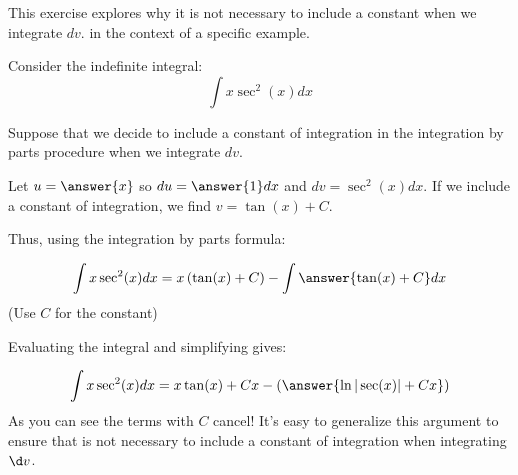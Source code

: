 \documentclass{ximera}
\author{Jim Talamo}
\begin{document}
\begin{exercise}
This exercise explores why it is not necessary to include a constant when we integrate $dv$. in the context of a specific example.

Consider the indefinite integral:
\[
\int x \sec^2(x) dx 
\]

Suppose that we decide to include a constant of integration in the integration by parts procedure when we integrate $dv$.

Let $u=\answer{x}$ so $du =\answer{1} dx$ and $dv = \sec^2(x) dx$.  If we include a constant of integration, we find $v = \tan(x)+C$.

Thus, using the integration by parts formula:

\[
\int x \sec^2(x) dx = x \left( \tan(x) +C \right) - \int \answer{\tan(x) +C} dx
\]
(Use $C$ for the constant)

\begin{exercise}

Evaluating the integral and simplifying gives:

\[
\int x \sec^2(x) dx = x \tan(x) +Cx - \left(\answer{\ln|\sec(x)| + Cx}\right)
\]
As you can see the terms with $C$ cancel!  It's easy to generalize this argument to ensure that is not necessary to include a constant of integration when integrating $\d v$.

\end{exercise}
\end{exercise}
\end{document}

